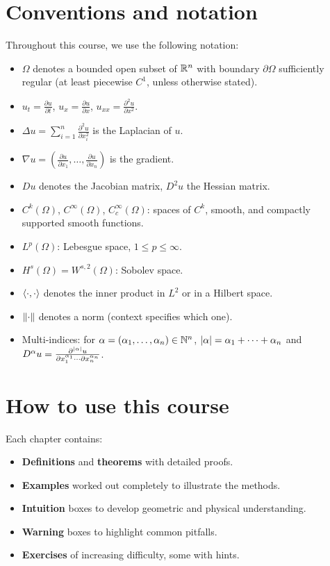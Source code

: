 \section*{Conventions and notation}

Throughout this course, we use the following notation:
\begin{itemize}
    \item $\Omega$ denotes a bounded open subset of $\mathbb{R}^n$ with boundary
          $\partial\Omega$ sufficiently regular (at least piecewise $C^1$,
          unless otherwise stated).
    \item $u_t = \frac{\partial u}{\partial t}$, $u_x = \frac{\partial u}{\partial x}$,
          $u_{xx} = \frac{\partial^2 u}{\partial x^2}$.
    \item $\Delta u = \sum_{i=1}^{n} \frac{\partial^2 u}{\partial x_i^2}$ is
          the Laplacian of $u$.
    \item $\nabla u = \left(\frac{\partial u}{\partial x_1}, \ldots,
          \frac{\partial u}{\partial x_n}\right)$ is the gradient.
    \item $Du$ denotes the Jacobian matrix, $D^2 u$ the Hessian matrix.
    \item $C^k(\Omega)$, $C^\infty(\Omega)$, $C_c^\infty(\Omega)$: spaces of
          $C^k$, smooth, and compactly supported smooth functions.
    \item $L^p(\Omega)$: Lebesgue space, $1 \leq p \leq \infty$.
    \item $H^s(\Omega) = W^{s,2}(\Omega)$: Sobolev space.
    \item $\langle \cdot, \cdot \rangle$ denotes the inner product in $L^2$ or in a
          Hilbert space.
    \item $\left\| \cdot \right\|$ denotes a norm (context specifies which one).
    \item Multi-indices: for $\alpha = (\alpha_1, \ldots, \alpha_n) \in \mathbb{N}^n$,
          $\left| \alpha \right| = \alpha_1 + \cdots + \alpha_n$ and
          $D^\alpha u = \frac{\partial^{\left| \alpha \right|} u}{\partial x_1^{\alpha_1}
          \cdots \partial x_n^{\alpha_n}}$.
\end{itemize}

\section*{How to use this course}

Each chapter contains:
\begin{itemize}
    \item \textbf{Definitions} and \textbf{theorems} with detailed proofs.
    \item \textbf{Examples} worked out completely to illustrate the methods.
    \item \textbf{Intuition} boxes to develop geometric and physical understanding.
    \item \textbf{Warning} boxes to highlight common pitfalls.
    \item \textbf{Exercises} of increasing difficulty, some with hints.
\end{itemize}

